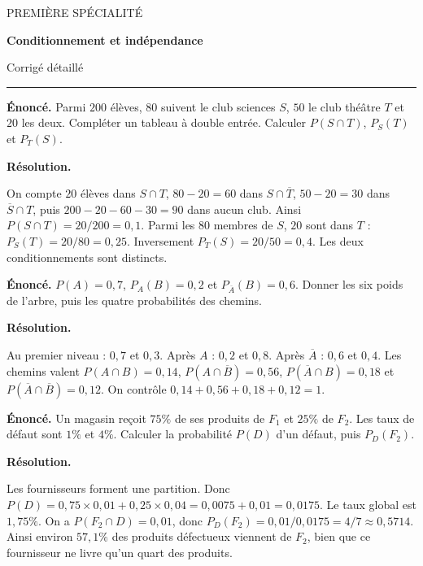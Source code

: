 \documentclass[11pt,a4paper]{article}
\begin{document}
{\small\color{Blue}PREMIÈRE SPÉCIALITÉ}\par{\LARGE\bfseries Conditionnement et indépendance}\par{\large Corrigé détaillé}\par\vspace{0.2cm}\hrule\vspace{0.4cm}
\par\noindent\begin{minipage}{\linewidth}
{\small\color{Muted}\textbf{Énoncé.} Parmi $200$ élèves, $80$ suivent le club sciences $S$, $50$ le club théâtre $T$ et $20$ les deux. Compléter un tableau à double entrée. Calculer $P(S\cap T)$, $P_S(T)$ et $P_T(S)$.}
\par\medskip
\textbf{Résolution.}\par
On compte $20$ élèves dans $S\cap T$, $80-20=60$ dans $S\cap\overline T$, $50-20=30$ dans $\overline S\cap T$, puis $200-20-60-30=90$ dans aucun club. Ainsi $P(S\cap T)=20/200=0,1$. Parmi les $80$ membres de $S$, $20$ sont dans $T$ : $P_S(T)=20/80=0,25$. Inversement $P_T(S)=20/50=0,4$. Les deux conditionnements sont distincts.
\end{minipage}\par
\par\noindent\begin{minipage}{\linewidth}
{\small\color{Muted}\textbf{Énoncé.} $P(A)=0,7$, $P_A(B)=0,2$ et $P_{\overline A}(B)=0,6$. Donner les six poids de l’arbre, puis les quatre probabilités des chemins.}
\par\medskip
\textbf{Résolution.}\par
Au premier niveau : $0,7$ et $0,3$. Après $A$ : $0,2$ et $0,8$. Après $\overline A$ : $0,6$ et $0,4$. Les chemins valent $P(A\cap B)=0,14$, $P(A\cap\overline B)=0,56$, $P(\overline A\cap B)=0,18$ et $P(\overline A\cap\overline B)=0,12$. On contrôle $0,14+0,56+0,18+0,12=1$.
\end{minipage}\par
\par\noindent\begin{minipage}{\linewidth}
{\small\color{Muted}\textbf{Énoncé.} Un magasin reçoit $75\%$ de ses produits de $F_1$ et $25\%$ de $F_2$. Les taux de défaut sont $1\%$ et $4\%$. Calculer la probabilité $P(D)$ d’un défaut, puis $P_D(F_2)$.}
\par\medskip
\textbf{Résolution.}\par
Les fournisseurs forment une partition. Donc $P(D)=0,75\times0,01+0,25\times0,04=0,0075+0,01=0,0175$. Le taux global est $1,75\%$. On a $P(F_2\cap D)=0,01$, donc $P_D(F_2)=0,01/0,0175=4/7\approx0,5714$. Ainsi environ $57,1\%$ des produits défectueux viennent de $F_2$, bien que ce fournisseur ne livre qu’un quart des produits.
\end{minipage}\par
\end{document}
